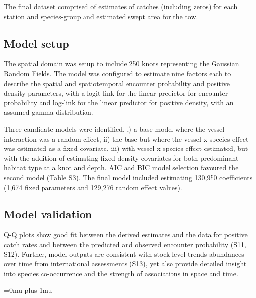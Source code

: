 \documentclass{nature}
\begin{document}
The final dataset comprised of estimates of catches (including zeros) for each
station and species-group and estimated swept area for the tow.

\subsection{Model setup}

The spatial domain was setup to include 250 knots representing the Gaussian
Random Fields. The model was configured to estimate nine factors each to describe
the spatial and spatiotemporal encounter probability and positive density
parameters, with a logit-link for the linear predictor for encounter
probability and log-link for the linear predictor for positive density, with an
assumed gamma distribution.

Three candidate models were identified, i) a base model where the vessel
interaction was a random effect, ii) the base but where the vessel x species
effect was estimated as a fixed covariate, iii) with vessel x species effect
estimated, but with the addition of estimating fixed density covariates for
both predominant habitat type at a knot and depth. AIC and BIC model selection
favoured the second model (Table S3). The final model included estimating
130,950 coefficients (1,674 fixed parameters and 129,276 random effect values).

\subsection{Model validation}

Q-Q plots show good fit between the derived estimates and the data for positive
catch rates and between the predicted and observed encounter probability (S11,
S12).  Further, model outputs are consistent with stock-level trends abundances
over time from international assessments (S13), yet also provide detailed
insight into species co-occurrence and the strength of associations in space
and time. 

\newpage
\Urlmuskip=0mu plus 1mu\relax

\small{}


\newpage

\end{document}
